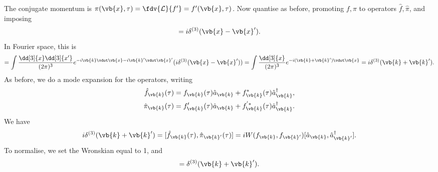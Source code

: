 \documentclass{jknotes}
\begin{document}
The conjugate momentum is \(\pi(\vb{x},\tau) = \fdv{\mathcal{L}}{f'} = f'(\vb{x},\tau)\). Now quantise as before, promoting \(f,\pi\) to operators \(\hat{f},\hat{\pi}\), and imposing
\begin{equation}
    [\hat{f}(\vb{x},\tau),\hat{\pi}(\vb{x}',\tau)] = i\delta^{(3)}(\vb{x}-\vb{x}').
\end{equation}
In Fourier space, this is
\begin{equation}
    [\hat{f}_{\vb{k}}(\tau),\hat{\pi}_{\vb{k}}(\tau)] = \int\frac{\dd[3]{x}\dd[3]{x'}}{(2\pi)^3}e^{-i\vb{k}\vdot\vb{x}-i\vb{k}'\vdot\vb{x}'}(i\delta^{(3)}(\vb{x}-\vb{x}')) = \int\frac{\dd[3]{x}}{(2\pi)^3}e^{-i(\vb{k}+\vb{k}')\vdot\vb{x}} = i\delta^{(3)}(\vb{k}+\vb{k}').
\end{equation}
As before, we do a mode expansion for the operators, writing
\begin{align}
    \hat{f}_{\vb{k}}(\tau) &= f_{\vb{k}}(\tau)\hat{a}_{\vb{k}} + f^*_{\vb{k}}(\tau)\hat{a}^\dagger_{\vb{k}}, \\
    \hat{\pi}_{\vb{k}}(\tau) &= f'_{\vb{k}}(\tau)\hat{a}_{\vb{k}} + f^{'*}_{\vb{k}}(\tau)\hat{a}^\dagger_{\vb{k}}.
\end{align}
We have
\begin{equation}
    i\delta^{(3)}(\vb{k}+\vb{k}') = [\hat{f}_{\vb{k}}(\tau),\hat{\pi}_{\vb{k}'}(\tau)] = iW(f_{\vb{k}},f_{\vb{k}'})[\hat{a}_{\vb{k}},\hat{a}^\dagger_{\vb{k}'}].
\end{equation}
To normalise, we set the Wronskian equal to 1, and
\begin{equation}
    [\hat{a}_{\vb{k}},\hat{a}^\dagger_{\vb{k}'}] = \delta^{(3)}(\vb{k}+\vb{k}').
\end{equation}
\end{document}
